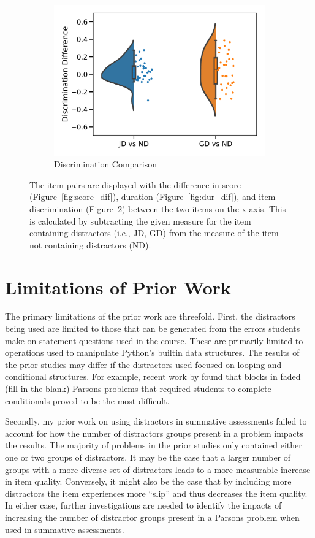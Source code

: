 \documentclass[authorversion,nonacm]{acmart}
\begin{document}
\begin{figure}
\begin{subfigure}[b]{0.30\textwidth}
    \includegraphics[width=\textwidth]{./imgs/discrim_dif.pdf}
    \caption{Discrimination Comparison}
    \label{fig:discrim_dif}
  \end{subfigure}
  \caption{The item pairs are displayed with the difference in score (Figure~\ref{fig:score_dif}), duration
  (Figure~\ref{fig:dur_dif}), and
  item-discrimination (Figure~\ref{fig:discrim_dif}) between the two items on
  the x axis. This is calculated by subtracting the given measure for the item containing
  distractors (i.e., JD, GD) from the measure of the item not containing
  distractors (ND).}
\end{figure}



\section{Limitations of Prior Work}

The primary limitations of the prior work are threefold. First, the distractors 
being used are limited to those that can be generated from the errors students
make on statement questions used in the course. These are primarily limited to 
operations used to manipulate Python's builtin data structures. The results of 
the prior studies may differ if the distractors used focused on looping and 
conditional structures. For example, recent work by \citet{} found that 
blocks in faded (fill in the blank) Parsons problems that required students
to complete conditionals proved to be the most difficult.


Secondly, my prior work on using distractors in summative assessments 
failed to account for how the number of distractors groups present in a problem
impacts the results. The majority of problems in the prior studies only
contained either one or two groups of distractors. It may be the case that
a larger number of groups with a more diverse set of distractors leads to 
a more measurable increase in item quality. Conversely, it might also be the
case that by including more distractors the item experiences more ``slip'' 
and thus decreases the item quality. In either case, further investigations
are needed to identify the impacts of increasing the number of distractor 
groups present in a Parsons problem when used in summative assessments.
\end{document}
